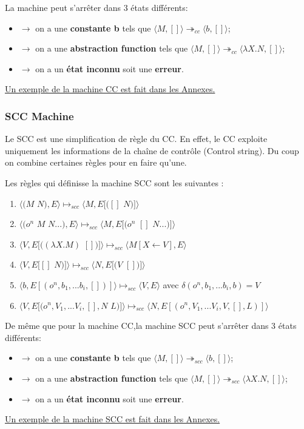 \documentclass[10pt,a4paper]{article}
\begin{document}
			La machine peut s'arrêter dans 3 états différents:
			\begin{itemize}
				\item[]$\longrightarrow$ on a une \textbf{constante b} tels que $\langle M,[]\rangle \twoheadrightarrow_{cc} \langle b,[]\rangle$;
				\item[]$\longrightarrow$ on a une \textbf{abstraction function} tels que $\langle M,[]\rangle \twoheadrightarrow_{cc} \langle\lambda X.N,[]\rangle$;
				\item[]$\longrightarrow$ on a un \textbf{état inconnu} soit une \textbf{erreur}.
			\end{itemize}
			\hyperref[CC]{Un exemple de la machine CC est fait dans les Annexes.}
			\bigbreak
			
			
			\subsubsection{SCC Machine}
			Le SCC est une simplification de règle du CC. En effet, le CC exploite uniquement les informations de la chaîne de contrôle (Control string). Du coup on combine certaines règles pour en faire qu'une.
			\bigbreak
			
			Les règles qui définisse la machine SCC sont les suivantes :
			
			\begin{enumerate}
				\item $\langle(M$ $N),E\rangle \longmapsto_{scc} \langle M,E[([]$ $N)]\rangle$
				\item $\langle(o^{n}$ $M$ $N...),E\rangle \longmapsto_{scc} \langle M,E[(o^{n}$ $[]$ $N...)]\rangle$
				\item $\langle V,E[((\lambda X.M)$ $[])]\rangle \longmapsto_{scc} \langle M[X\leftarrow V],E\rangle$
				\item $\langle V,E[[]$ $N)]\rangle \longmapsto_{scc} \langle N,E[(V$ $[])]\rangle$
				\item $\langle b,E[(o^{n},b_{1},...b_{i},[])]\rangle \longmapsto_{scc} \langle V,E\rangle$ avec $\delta (o^{n},b_{1},...b_{i},b)=V$ 
				\item $\langle V,E[(o^{n},V_{1},...V_{i},[],N$ $L)]\rangle \longmapsto_{scc} \langle N,E[(o^{n},V_{1},...V_{i},V,[],L)]\rangle$
			\end{enumerate}
			\bigbreak
			
			De même que pour la machine CC,la machine SCC peut s'arrêter dans 3 états différents:
			\begin{itemize}
				\item[]$\longrightarrow$ on a une \textbf{constante b} tels que $\langle M,[]\rangle \twoheadrightarrow_{scc} \langle b,[]\rangle$;
				\item[]$\longrightarrow$ on a une \textbf{abstraction function} tels que $\langle M,[]\rangle \twoheadrightarrow_{scc} \langle\lambda X.N,[]\rangle$;
				\item[]$\longrightarrow$ on a un \textbf{état inconnu} soit une \textbf{erreur}.
			\end{itemize}
			\bigbreak
			\hyperref[SCC]{Un exemple de la machine SCC est fait dans les Annexes.}
			\newpage
\end{document}

